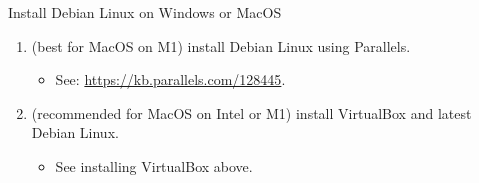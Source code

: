 \begin{frame}{Install Debian Linux on Windows or MacOS}
\begin{enumerate}
    \item[Or] (best for \alert{MacOS} on M1) install Debian Linux using \alert{Parallels}.
    \begin{itemize}
      \item See: \alert{\href{https://kb.parallels.com/128445}{https://kb.parallels.com/128445}}.
    \end{itemize}
    \item[Or] (recommended for \alert{MacOS} on Intel or M1) install \alert{VirtualBox} and latest Debian Linux.
    \begin{itemize}
      \item See installing \alert{VirtualBox} above.
    \end{itemize}
  \end{enumerate}
\end{frame}

